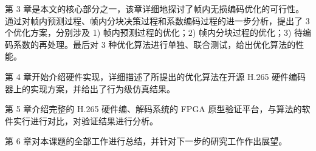 第 3 章是本文的核心部分之一，该章详细地探讨了帧内无损编码优化的可行性。通过对帧内预测过程、帧内分块决策过程和系数编码过程的进一步分析，提出了 3 个优化方案，分别涉及 1) 帧内预测过程的优化；2) 帧内分块过程的优化；3) 待编码系数的再处理。最后对 3 种优化算法进行单独、联合测试，给出优化算法的性能。

第 4 章开始介绍硬件实现，详细描述了所提出的优化算法在开源 H.265 硬件编码器上的实现方案，并给出了行为级仿真结果。

第 5 章介绍完整的 H.265 硬件编、解码系统的 FPGA 原型验证平台，与算法的软件实行进行对比，对验证结果进行分析。

第 6 章对本课题的全部工作进行总结，并针对下一步的研究工作作出展望。
